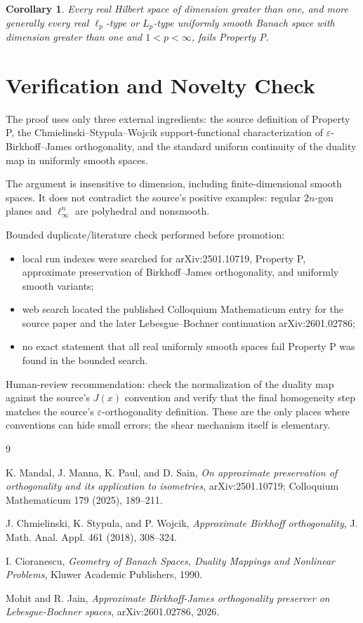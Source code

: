 \documentclass[11pt]{article}
\newtheorem{corollary}{Corollary}
\newcommand{\eps}{\varepsilon}
\begin{document}
\begin{corollary}
Every real Hilbert space of dimension greater than one, and more generally every
real \(\ell_p\)-type or \(L_p\)-type uniformly smooth Banach space with
dimension greater than one and \(1<p<\infty\), fails Property P.
\end{corollary}

\section*{Verification and Novelty Check}

The proof uses only three external ingredients: the source definition of Property
P, the Chmielinski--Stypula--Wojcik support-functional characterization of
\(\eps\)-Birkhoff--James orthogonality, and the standard uniform continuity of
the duality map in uniformly smooth spaces.

The argument is insensitive to dimension, including finite-dimensional smooth
spaces.  It does not contradict the source's positive examples: regular
\(2n\)-gon planes and \(\ell_\infty^n\) are polyhedral and nonsmooth.

Bounded duplicate/literature check performed before promotion:
\begin{itemize}
  \item local run indexes were searched for arXiv:2501.10719, Property P,
  approximate preservation of Birkhoff--James orthogonality, and uniformly
  smooth variants;
  \item web search located the published Colloquium Mathematicum entry for the
  source paper and the later Lebesgue--Bochner continuation arXiv:2601.02786;
  \item no exact statement that all real uniformly smooth spaces fail Property P
  was found in the bounded search.
\end{itemize}

Human-review recommendation: check the normalization of the duality map against
the source's \(J(x)\) convention and verify that the final homogeneity step
matches the source's \(\eps\)-orthogonality definition.  These are the only
places where conventions can hide small errors; the shear mechanism itself is
elementary.

\begin{thebibliography}{9}

K. Mandal, J. Manna, K. Paul, and D. Sain,
\emph{On approximate preservation of orthogonality and its application to
isometries}, arXiv:2501.10719; Colloquium Mathematicum 179 (2025), 189--211.

J. Chmielinski, K. Stypula, and P. Wojcik,
\emph{Approximate Birkhoff orthogonality}, J. Math. Anal. Appl. 461 (2018),
308--324.

I. Cioranescu,
\emph{Geometry of Banach Spaces, Duality Mappings and Nonlinear Problems},
Kluwer Academic Publishers, 1990.

Mohit and R. Jain,
\emph{Approximate Birkhoff-James orthogonality preserver on
Lebesgue-Bochner spaces}, arXiv:2601.02786, 2026.

\end{thebibliography}
\end{document}
